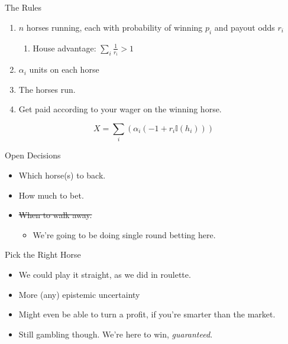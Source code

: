 \documentclass[pdf]{beamer}
\begin{document}
\subsection{}
\begin{frame}{The Rules}
  \begin{enumerate}
  \item $n$ horses running, each with probability of winning $p_i$ and payout odds $r_i$
    \begin{enumerate}
      \item House advantage: $\sum_i \frac{1}{r_i} > 1$
    \end{enumerate}
  \item $\alpha_i$ units on each horse
  \item The horses run.
  \item Get paid according to your wager on the winning horse.
  \end{enumerate}

  \[ X = \sum_i \left( \alpha_i (-1 + r_i\mathbb{I}(h_i)) \right) \]
\end{frame}

\begin{frame}{Open Decisions}
  \begin{itemize}
  \item Which horse(s) to back.
  \item How much to bet.
  \item \sout{When to walk away.}
    \begin{itemize}
      \item We're going to be doing single round betting here.
    \end{itemize}
  \end{itemize}
\end{frame}

\begin{frame}{Pick the Right Horse}
  \begin{itemize}
  \item We could play it straight, as we did in roulette.
  \item More (any) epistemic uncertainty
  \item Might even be able to turn a profit, if you're smarter than the market.
  \item Still gambling though. We're here to win, \emph{guaranteed}.
  \end{itemize}
\end{frame}
\end{document}
